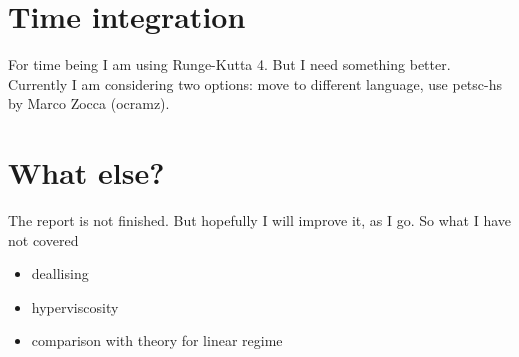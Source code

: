 \documentclass[preprint,aip,pop]{article}
\begin{document}
\section {Time integration}
For time being I am using Runge-Kutta 4. But I need something better. Currently I
am considering two options: move to different language, use petsc-hs by 
 Marco Zocca (ocramz).

\section{What else?}
The report is not finished.
But hopefully I will improve it, as I go.
So what I have not covered
\begin{itemize}
\item deallising
\item hyperviscosity
\item comparison with theory for linear regime
\end{itemize}


 
\end{document}
